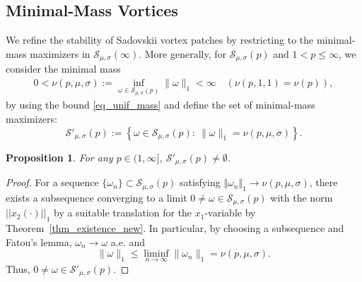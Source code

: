 \documentclass[11pt]{amsart}
\newtheorem{proposition}[theorem]{Proposition}
\theoremstyle{definition}
\theoremstyle{definition}
\numberwithin{equation}{section}
\newcommand{\nrm}[1]{\Vert#1\Vert}
\newcommand{\set}[1]{\{#1\}}
\newcommand{\0}{\emptyset}
\newcommand{\omg}{\omega}
\newcommand{\calS}{\mathcal S}
\begin{document}
			
			\subsection{Minimal-Mass Vortices}\label{sec:patch_stability}
We {refine the stability} of Sadovskii vortex patches by restricting to the minimal-mass maximizers in $\calS_{\mu, \sigma}(\infty)$. 
            More generally, for $\calS_{\mu,\sigma}(p)$ and $1<p\leq \infty$, we consider the minimal mass
			\begin{align*}
				0<\nu(p, \mu, \sigma) := \inf_{\omega\in \calS_{\mu,\sigma}(p) }\|\omega\|_1<\infty \quad \left( \nu \left(p, 1, 1 \right) = \nu \left(p\right) \right),
			\end{align*}
			by using the bound \eqref{eq_unif_mass} and define the set of minimal-mass maximizers:
			\begin{equation}\label{def_min_mass}
			    \calS'_{\mu,\sigma}(p)
			:=\left\{
			\omega\in \calS_{\mu,\sigma}(p):\
			\|\omega\|_1=\nu(p, \mu, \sigma)
			\right\}.
			\end{equation}
			
			
			
			\begin{proposition}
				For any $p \in (1, \infty]$,
				$\calS'_{\mu,\sigma}(p)
				\neq \emptyset
				$.
			\end{proposition}
			\begin{proof}
				For a sequence $\set{\omg_n}\subset \calS_{\mu,\sigma}(p)$ satisfying $\nrm{\omg_n}_1\to\nu(p, \mu, \sigma)$, there exists a subsequence converging to a limit $0\neq \omg\in \calS_{\mu,\sigma}(p)$ with the norm $||x_2(\cdot)||_{1}$ by a suitable translation for the $x_1$-variable by Theorem~\ref{thm_existence_new}. In particular, by choosing a subsequence and Fatou's lemma, $\omega_n\to \omega$ a.e. and  
                \[
                \|\omega\|_1 \le \liminf_{n \to \infty} \|\omega_n \|_1 = \nu(p, \mu, \sigma).
                \]
                Thus, $0\neq \omega\in \calS'_{\mu,\sigma}(p)$.
			\end{proof}
\end{document}
